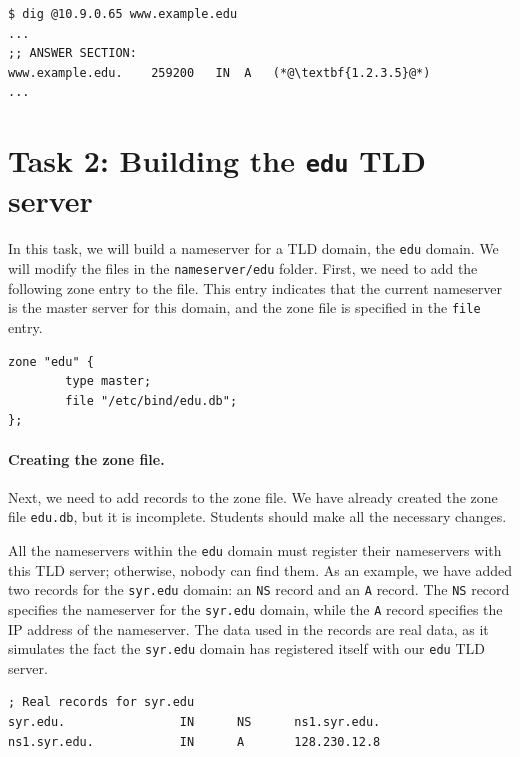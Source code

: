 \begin{lstlisting}
$ dig @10.9.0.65 www.example.edu
... 
;; ANSWER SECTION:
www.example.edu.    259200   IN  A   (*@\textbf{1.2.3.5}@*)
...
\end{lstlisting}





\section{Task 2: Building the \texttt{edu} TLD server}


In this task, we will build a nameserver for a TLD domain, 
the \texttt{edu} domain.
We will modify the files in the \texttt{nameserver/edu} folder. 
First, we need to  add the following zone entry to the
 file. This entry indicates that the current nameserver
is the master server for this domain, and the zone file is
specified in the \texttt{file} entry.

\begin{lstlisting}
zone "edu" {
        type master;
        file "/etc/bind/edu.db";
};
\end{lstlisting}


\paragraph{Creating the zone file.} Next, we need to
add records to the zone file. 
We have already created the zone file \texttt{edu.db},
but it is incomplete. Students should make all the 
necessary changes. 

All the nameservers within the \texttt{edu} domain
must register their nameservers with this 
TLD server; otherwise, nobody can find them. As an example,
we have added two records for the \texttt{syr.edu} domain: 
an \texttt{NS} record and an \texttt{A} record.
The \texttt{NS} record specifies the nameserver for the 
\texttt{syr.edu} domain, while the \texttt{A} record
specifies the IP address of the nameserver. The
data used in the records are real data, as it simulates
the fact the \texttt{syr.edu} domain has registered 
itself with our \texttt{edu} TLD server.

\begin{lstlisting}
; Real records for syr.edu
syr.edu.                IN      NS      ns1.syr.edu.
ns1.syr.edu.            IN      A       128.230.12.8
\end{lstlisting}
 


